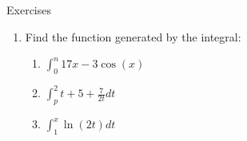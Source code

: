 \documentclass[../revisedmain.tex]{subfiles}
\begin{document}
	\newpage
	\begin{center}
		\LARGE Exercises
	\end{center}
	\begin{enumerate}
		\item Find the function generated by the integral:
		\begin{enumerate}
			\item $\int_{0}^{n}17x-3\cos(x)$
			\item $\int_{p}^{2}t+5+\frac{7}{2t}dt$
			\item $\int_{1}^{x}\ln(2t)dt$
		\end{enumerate}
	\end{enumerate}
\end{document}
